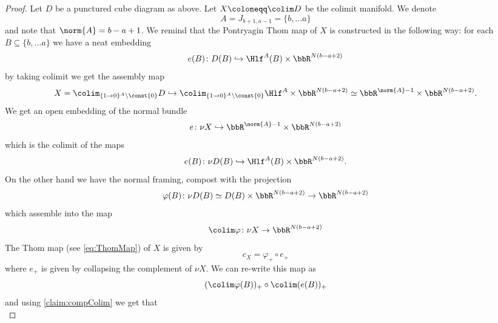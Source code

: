 \begin{proof}
    Let $D$ be a punctured cube diagram as above. Let $X \coloneqq \colim D$ be the colimit manifold.
    We denote
    \begin{equation*}
        A = J_{b+1,a-1} = \{b,\dots a\}
    \end{equation*}
    and note that $\norm{A} = b-a+1$.
    We remind that the Pontryagin Thom map of $X$ is constructed in the following way: for each $B \subseteq \{b,\dots a\}$ we have a neat embedding
    \begin{equation*}
        e(B) \colon D(B) \hookrightarrow \Hlf^A(B) \times \bbR^{N(b-a+2)}
    \end{equation*}
    by taking colimit we get the assembly map
    \begin{equation*}
        X = \colim_{\{1\to 0\}^{A} \setminus \const{0}} D \hookrightarrow
        \colim_{\{1\to 0\}^{A} \setminus \const{0}} \Hlf^{A} \times \bbR^{N(b-a+2)} \simeq \bbR^{\norm{A}-1} \times \bbR^{N(b-a+2)}.
    \end{equation*}
    We get an open embedding of the normal bundle
    \begin{equation*}
        e \colon \nu X \hookrightarrow \bbR^{\norm{A}-1} \times \bbR^{N(b-a+2)}
    \end{equation*}
    which is the colimit of the maps
    \begin{equation*}
        e(B) \colon \nu D(B) \hookrightarrow \Hlf^A(B) \times \bbR^{N(b-a+2)}.
    \end{equation*}
    On the other hand we have the normal framing, compost with the projection
    \begin{equation*}
        \varphi(B) \colon \nu D(B) \simeq D(B) \times \bbR^{N(b-a+2)} \to \bbR^{N(b-a+2)}
    \end{equation*}
    which assemble into the map
    \begin{equation*}
        \colim \varphi \colon \nu X \to \bbR^{N(b-a+2)}
    \end{equation*}
    The Thom map (see \cref{eq:ThomMap}) of $X$ is given by
    \begin{equation*}
        c_X = \varphi_+ \circ e_+
    \end{equation*}
    where $e_+$ is given by collapsing the complement of $\nu X$.
    We can re-write this map as
    \begin{equation*}
        (\colim \varphi(B))_+ \circ \colim(e(B))_+
    \end{equation*}
    and using \cref{claim:compColim} we get that
    \begin{equation*}

\end{equation*}
\end{proof}
